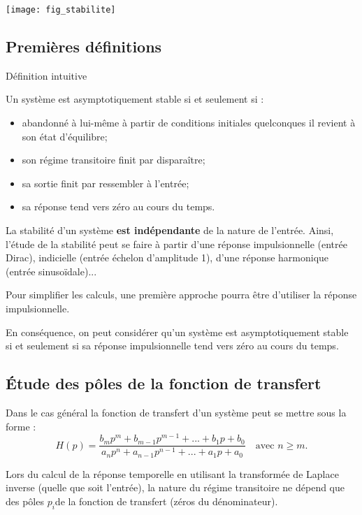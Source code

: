 \begin{center}
\texttt{[image: fig\_stabilite]}
\end{center}
\subsection{Premières définitions}
\begin{defi}{Définition intuitive}

Un système est asymptotiquement stable si et seulement si : 
\begin{itemize}
\item abandonné à lui-même à partir de conditions initiales quelconques il revient à son état d'équilibre;
\item son régime transitoire finit par disparaître;
\item sa sortie finit par ressembler à l'entrée;
\item sa réponse tend vers zéro au cours du temps.
\end{itemize}

\end{defi}

\begin{rem}
La stabilité d'un système \textbf{est indépendante} de la nature de l'entrée. Ainsi, l'étude de la stabilité peut se faire à partir d'une réponse impulsionnelle (entrée Dirac), indicielle (entrée échelon d'amplitude 1), d'une réponse harmonique (entrée sinusoïdale)...

Pour simplifier les calculs, une première approche pourra être d'utiliser la réponse impulsionnelle. 
\end{rem}
\begin{defi}{}
En conséquence, on peut considérer qu'un système est asymptotiquement stable si et seulement si sa réponse impulsionnelle tend vers zéro au cours du temps.
\end{defi}

\subsection{Étude des pôles de la fonction de transfert}
Dans le cas général la fonction de transfert d'un système peut se mettre sous la forme :
$$
H(p)=\dfrac{b_mp^m + b_{m-1}p^{m-1}+...+b_1p+b_0}{a_np^n + a_{n-1}p^{n-1}+...+a_1p+a_0} \quad \text{avec } n\geq m.
$$

Lors du calcul de la réponse temporelle en utilisant la transformée de Laplace inverse (quelle que soit l'entrée), la nature du régime transitoire ne dépend que des pôles $p_i$de la fonction de transfert (zéros du dénominateur).


